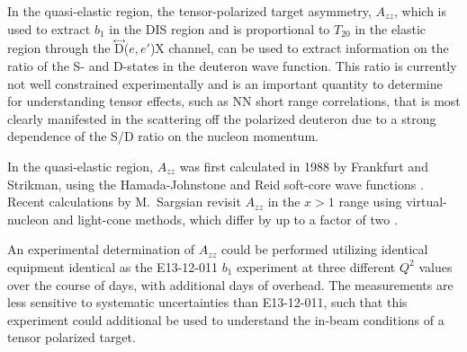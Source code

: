 

In the quasi-elastic region, the tensor-polarized target asymmetry, $A_{zz}$, which is used to extract $b_1$ in the DIS region and is proportional to $T_{20}$ in the elastic region through the $\stackrel{\leftrightarrow}{\mathrm{D}}$($e,e'$)X channel, can be used to extract information on the ratio of the S- and D-states in the deuteron wave function. This ratio is currently not well constrained experimentally and is an important quantity to determine for understanding tensor effects, such as NN short range correlations, that is most clearly manifested in the scattering off the polarized deuteron due to a strong dependence of the S/D ratio on the nucleon momentum.

In the quasi-elastic region, $A_{zz}$ was first calculated in 1988 by Frankfurt and Strikman, using the Hamada-Johnstone and Reid soft-core wave functions \cite{Frankfurt:1988nt}. Recent calculations by {M.~Sargsian} revisit $A_{zz}$ in the $x>1$ range using virtual-nucleon and light-cone methods, which differ by up to a factor of two \cite{MISAK}. 

An experimental determination of $A_{zz}$ could be performed utilizing identical equipment identical as the E13-12-011 $b_1$ experiment at three different $Q^2$ values over the course of \productiondays days, with \overheaddays additional days of overhead. The measurements are less sensitive to systematic uncertainties than E13-12-011, such that this experiment could additional be used to understand the in-beam conditions of a tensor polarized target.
